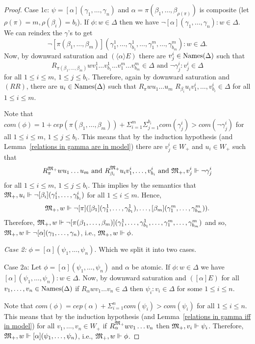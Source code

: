 \begin{proof}
    \par Case 1c: $\psi=[\alpha](\gamma_1,\ldots,\gamma_n)$ and $\alpha=\pi(\beta_1,\ldots,\beta_{\rho(\pi)})$ is composite (let $\rho(\pi)=m, \rho(\beta_i)=b_i$). If $\phi:w\in\Delta$ then we have $\neg[\alpha](\gamma_1,\ldots,\gamma_n):w\in\Delta$. We can reindex the $\gamma$'s to get $$\neg[\pi(\beta_1,\ldots,\beta_m)](\gamma_1^1,\ldots,\gamma_{b_1}^1,\ldots,\gamma_1^{m},\ldots,\gamma_{b_m}^m):w\in\Delta.$$ 
    Now, by downward saturation and $(\langle\alpha\rangle E)$ there are $v^i_j\in\text{Names}(\Delta)$ such that
    $$R_{\pi(\beta_1,\ldots,\beta_{m})}wv_1^1\ldots v_{b_1}^1\ldots v_1^{m}\ldots v_{b_m}^{m}\in\Delta \text { and } \neg\gamma_j^i:v_j^i\in\Delta$$ for all $1\leq i\leq m$, $1\leq j\leq b_i$. Therefore, again by downward saturation and $(RR)$, there are $u_i\in\text{Names}(\Delta)$ such that $R_{\pi}wu_1\ldots u_{m}$ \text{,} $R_{\beta_i}u_iv_1^i,\ldots,v_{b_i}^i \in\Delta$ for all $1\leq i\leq m$. 
    \par Note that $com(\phi) = 1 + cep(\pi(\beta_1,\ldots,\beta_{m})) + \Sigma_{i=1}^m\Sigma_{j=1}^{b_i}com(\gamma_j^i) > com(\neg\gamma_j^i)$ for all $1\leq i\leq m$, $1\leq j\leq b_i$.
    This means that by the induction hypothesis (and Lemma~\ref{relations in gamma are in model}) there are $v^i_j\in W_+$ and $u_i\in W_+$ such that  $$R^{{\mathfrak{M}_+}}_{\pi}wu_1\ldots u_{m} \text{ and } R^{{\mathfrak{M}_+}}_{\beta_i}u_iv_1^i,\ldots,v_{b_i}^i \text{ and } {\mathfrak{M}_+},v_j^i\Vdash \neg\gamma_j^i$$ for all $1\leq i\leq m$, $1\leq j\leq b_i$.
    This implies by the semantics that ${\mathfrak{M}_+},u_i \Vdash \neg[\beta_i](\gamma_1^i,\ldots,\gamma_{b_i}^i)$ for all $1\leq i\leq m$. Hence, $${\mathfrak{M}_+},w\Vdash \neg[\pi]([\beta_1](\gamma_1^1,\ldots,\gamma_{b_1}^1),\ldots,[\beta_{m}](\gamma_1^{m},\ldots,\gamma_{b_m}^{m})).$$
    Therefore, ${\mathfrak{M}_+},w\Vdash \neg[\pi(\beta_1,\ldots,\beta_{m})](\gamma_1^1,\ldots,\gamma_{b_1}^1,\ldots,\gamma_1^{m},\ldots,\gamma_{b_m}^{m})$ and so, ${\mathfrak{M}_+}, w\Vdash \neg[\alpha](\gamma_1,\ldots,\gamma_n)$, i.e., ${\mathfrak{M}_+},w\Vdash\phi$.

    \par \textit{Case 2:} $\phi=[\alpha](\psi_1,\ldots,\psi_n)$. Which we split it into two cases. 
    
    \par Case 2a: Let $\phi = [\alpha](\psi_1,\ldots,\psi_n)$ and $\alpha$ be atomic. If $\phi:w\in\Delta$ we have $[\alpha](\psi_1,\ldots,\psi_n):w\in\Delta$. Now, by downward saturation and $([\alpha]E)$ for all $v_1,\ldots,v_n\in\text{Names}(\Delta)$ if $R_\alpha wv_1\ldots v_n\in\Delta$ then $\psi_i:v_i\in\Delta$ for some $1\leq i\leq n$.
    \par Note that $com(\phi) = cep(\alpha) + \Sigma_{i=1}^n com(\psi_i) > com(\psi_i)$ for all $1\leq i\leq n$. This means that by the induction hypothesis (and Lemma~\ref{relations in gamma iff in model}) for all $v_1,\ldots,v_n\in W_+$ if $R_\alpha^{{\mathfrak{M}_+}} wv_1\ldots v_n$ then ${\mathfrak{M}_+},v_i\Vdash \psi_i$. Therefore, ${\mathfrak{M}_+},w\Vdash[\alpha](\psi_1,\ldots,\psi_n)$, i.e., ${\mathfrak{M}_+},w\Vdash \phi$.


\end{proof}

